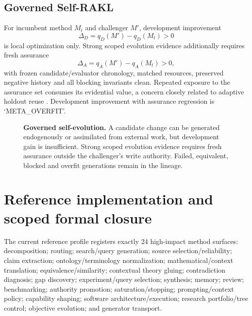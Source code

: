 \documentclass[11pt]{article}
\begin{document}
\subsection{Governed Self-RAKL}
For incumbent method $M_t$ and challenger $M'$, development improvement
\begin{equation}
\Delta_D=q_D(M')-q_D(M_t)>0
\end{equation}
is local optimization only. Strong scoped evolution evidence additionally requires fresh assurance
\begin{equation}
\Delta_A=q_A(M')-q_A(M_t)>0,
\end{equation}
with frozen candidate/evaluator chronology, matched resources, preserved negative history and all blocking invariants clean. Repeated exposure to the assurance set consumes its evidential value, a concern closely related to adaptive holdout reuse \citep{dwork2015reusable}. Development improvement with assurance regression is `META\_OVERFIT'.

\begin{figure}[t]
\centering
\resizebox{\textwidth}{!}{}
\caption{\textbf{Governed self-evolution.} A candidate change can be generated endogenously or assimilated from external work, but development gain is insufficient. Strong scoped evolution evidence requires fresh assurance outside the challenger's write authority. Failed, equivalent, blocked and overfit generations remain in the lineage.}
\label{fig:selfevolution}
\end{figure}

\section{Reference implementation and scoped formal closure}
The current reference profile registers exactly 24 high-impact method surfaces: decomposition; routing; search/query generation; source selection/reliability; claim extraction; ontology/terminology normalization; mathematical/context translation; equivalence/similarity; contextual theory gluing; contradiction diagnosis; gap discovery; experiment/query selection; synthesis; memory; review; benchmarking; authority promotion; saturation/stopping; prompting/context policy; capability shaping; software architecture/execution; research portfolio/tree control; objective evolution; and generator transport.
\end{document}
